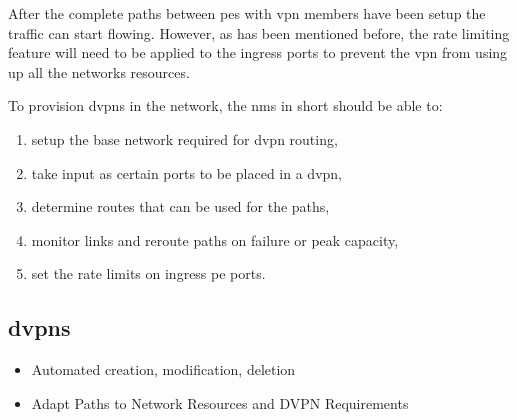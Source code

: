 After the complete paths between \acp{pe} with \ac{vpn} members have been setup the traffic can start flowing. However, as has been mentioned before, the rate limiting feature will need to be applied to the ingress ports to prevent the \ac{vpn} from using up all the networks resources. 

To provision \acp{dvpn} in the network, the \ac{nms} in short should be able to:

\begin{enumerate}
	\item setup the base network required for \ac{dvpn} routing,
	\item take input as certain ports to be placed in a \ac{dvpn},
	\item determine routes that can be used for the paths,
	\item monitor links and reroute paths on failure or peak capacity,
	\item set the rate limits on ingress \ac{pe} ports.
\end{enumerate}





\subsection{\acsp{dvpn}} %
\label{sub:dvpn}



\begin{itemize}
	\item Automated creation, modification, deletion
	\item Adapt Paths to Network Resources and DVPN Requirements
\end{itemize}



